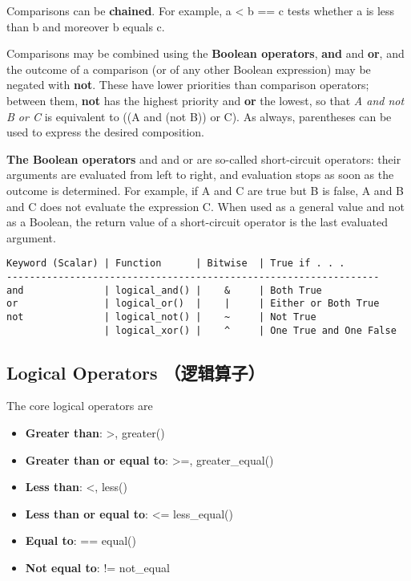 \documentclass{article}
\begin{document}
Comparisons can be \textbf{chained}. For example, a \textless{} b == c
tests whether a is less than b and moreover b equals c.

Comparisons may be combined using the \textbf{Boolean operators},
\textbf{and} and \textbf{or}, and the outcome of a comparison (or of any
other Boolean expression) may be negated with \textbf{not}. These have
lower priorities than comparison operators; between them, \textbf{not}
has the highest priority and \textbf{or} the lowest, so that \emph{A and
not B or C} is equivalent to ((A and (not B)) or C). As always,
parentheses can be used to express the desired composition.

\textbf{The Boolean operators} and and or are so-called short-circuit
operators: their arguments are evaluated from left to right, and
evaluation stops as soon as the outcome is determined. For example, if A
and C are true but B is false, A and B and C does not evaluate the
expression C. When used as a general value and not as a Boolean, the
return value of a short-circuit operator is the last evaluated argument.

\begin{verbatim}
Keyword (Scalar) | Function      | Bitwise  | True if . . .
-----------------------------------------------------------------
and              | logical_and() |    &     | Both True
or               | logical_or()  |    |     | Either or Both True
not              | logical_not() |    ~     | Not True
                 | logical_xor() |    ^     | One True and One False
\end{verbatim}

    \subsection{Logical Operators
（逻辑算子）}\label{logical-operators-ux903bux8f91ux7b97ux5b50}

The core logical operators are

\begin{itemize}
\itemsep1pt\parskip0pt
\item
  \textbf{Greater than}: \textgreater{}, greater()
\item
  \textbf{Greater than or equal to}: \textgreater{}=, greater\_equal()
\item
  \textbf{Less than}: \textless{}, less()
\item
  \textbf{Less than or equal to}: \textless{}= less\_equal()
\item
  \textbf{Equal to}: == equal()
\item
  \textbf{Not equal to}: != not\_equal
\end{itemize}
\end{document}
